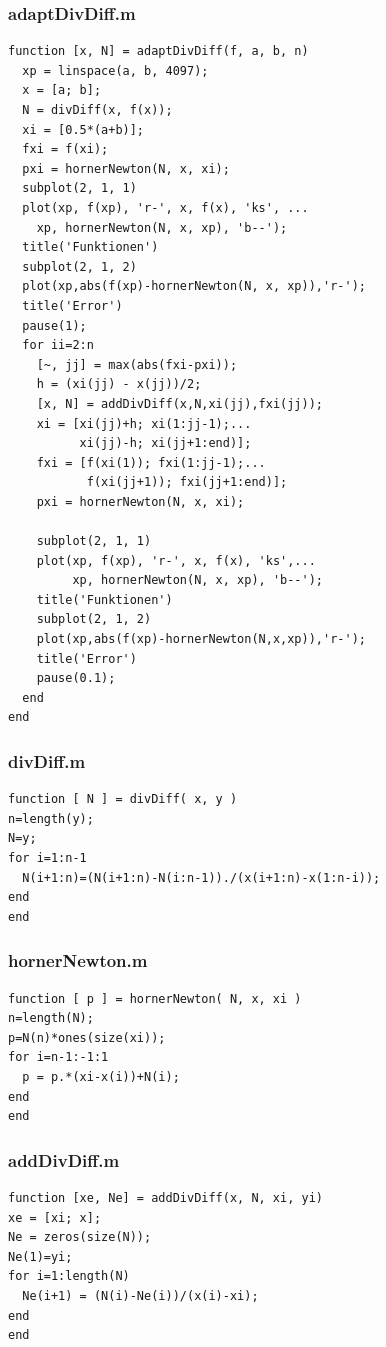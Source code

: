 \documentclass[ngerman,12pt]{article}
\begin{document}
\lstset{language=Matlab,basicstyle=\ttfamily,columns=fixed}
\subsubsection*{adaptDivDiff.m}
\begin{lstlisting}[frame=single]
function [x, N] = adaptDivDiff(f, a, b, n)
  xp = linspace(a, b, 4097);
  x = [a; b];
  N = divDiff(x, f(x));
  xi = [0.5*(a+b)];
  fxi = f(xi);
  pxi = hornerNewton(N, x, xi);
  subplot(2, 1, 1)
  plot(xp, f(xp), 'r-', x, f(x), 'ks', ...
    xp, hornerNewton(N, x, xp), 'b--');
  title('Funktionen')
  subplot(2, 1, 2)
  plot(xp,abs(f(xp)-hornerNewton(N, x, xp)),'r-');
  title('Error')
  pause(1);
  for ii=2:n
    [~, jj] = max(abs(fxi-pxi));
    h = (xi(jj) - x(jj))/2;
    [x, N] = addDivDiff(x,N,xi(jj),fxi(jj));
    xi = [xi(jj)+h; xi(1:jj-1);...
          xi(jj)-h; xi(jj+1:end)];
    fxi = [f(xi(1)); fxi(1:jj-1);...
           f(xi(jj+1)); fxi(jj+1:end)];
    pxi = hornerNewton(N, x, xi);
    
    subplot(2, 1, 1)
    plot(xp, f(xp), 'r-', x, f(x), 'ks',...
         xp, hornerNewton(N, x, xp), 'b--');
    title('Funktionen')
    subplot(2, 1, 2)
    plot(xp,abs(f(xp)-hornerNewton(N,x,xp)),'r-');
    title('Error')
    pause(0.1);
  end
end
\end{lstlisting}

\subsubsection*{divDiff.m}
\begin{lstlisting}[frame=single]
function [ N ] = divDiff( x, y )
n=length(y);
N=y;
for i=1:n-1
  N(i+1:n)=(N(i+1:n)-N(i:n-1))./(x(i+1:n)-x(1:n-i));
end
end
\end{lstlisting}
\subsubsection*{hornerNewton.m}
\begin{lstlisting}[frame=single]
function [ p ] = hornerNewton( N, x, xi )
n=length(N);
p=N(n)*ones(size(xi));
for i=n-1:-1:1
  p = p.*(xi-x(i))+N(i);
end
end
\end{lstlisting}

\subsubsection*{addDivDiff.m}
\begin{lstlisting}[frame=single]
function [xe, Ne] = addDivDiff(x, N, xi, yi)
xe = [xi; x];
Ne = zeros(size(N));
Ne(1)=yi;
for i=1:length(N)
  Ne(i+1) = (N(i)-Ne(i))/(x(i)-xi);
end
end
\end{lstlisting}
\end{document}
